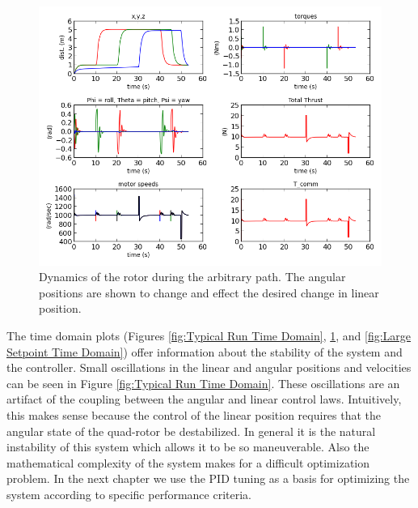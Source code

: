 \begin{figure}[htbp]
	\centering
		\includegraphics[scale = 0.5]{Figures/CubeEdgesGraphs.png}
	\caption[Cube Edges Time Domain]{Dynamics of the rotor during the arbitrary path. The angular positions are shown to change and effect the desired change in linear position.}
	\label{fig:Cube Edges Time Domain}
\end{figure}
The time domain plots (Figures     \ref{fig:Typical Run Time Domain},   \ref{fig:Cube Edges Time Domain}, and \ref{fig:Large Setpoint Time Domain}) offer information about the stability of the system and the controller. Small oscillations in the linear and angular positions and velocities can be seen in Figure \ref{fig:Typical Run Time Domain}. These oscillations are an artifact of the coupling between the angular and linear control laws. Intuitively, this makes sense because the control of the linear position requires that the angular state of the quad-rotor be destabilized. In general it is the natural instability of this system which allows it to be so maneuverable. Also the mathematical complexity of the system makes for a difficult optimization problem. In the next chapter we use the PID tuning as a basis for optimizing the system according to specific performance criteria.
